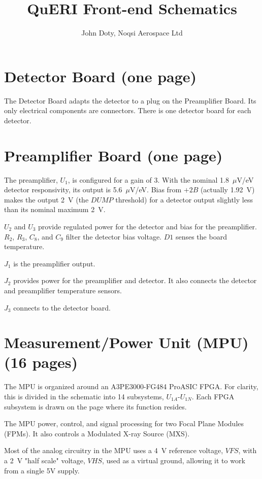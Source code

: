 \documentclass[11pt]{article}
\title{QuERI Front-end Schematics}
\author{John Doty, Noqsi Aerospace Ltd}
\begin{document}
\maketitle

\section{Detector Board (one page)}
The Detector Board adapts the detector to a plug on the Preamplifier Board. Its only electrical components are connectors. There is one detector board for each detector.
\section{Preamplifier Board (one page)}

The preamplifier, $U_1$, is configured for a gain of 3. With the nominal 1.8\ $\mu$V/eV detector responsivity, its output is 5.6\ $\mu$V/eV. Bias from $+2B$ (actually 1.92\ V) makes the output 2\ V (the $DUMP$ threshold) for a detector output slightly less than its nominal maximum 2\ V.

$U_2$ and $U_3$ provide regulated power for the detector and bias for the preamplifier. $R_2$, $R_3$, $C_8$, and $C_9$ filter the detector bias voltage. $D1$ senses the board temperature.

$J_1$ is the preamplifier output.

$J_2$ provides power for the preamplifier and detector. It also connects the detector and preamplifier temperature sensors.

$J_3$ connects to the detector board.

\section{Measurement/Power Unit (MPU) (16 pages)}

The MPU is organized around an A3PE3000-FG484 ProASIC FPGA. For clarity, this is divided in the schematic into 14 subsystems, $U_{1A}$-$U_{1N}$. Each FPGA subsystem is drawn on the page where its function resides.

The MPU power, control, and signal processing for two Focal Plane Modules (FPMs). It also controls a Modulated X-ray Source (MXS).

Most of the analog circuitry in the MPU uses a 4\ V reference voltage, $VFS$, with a 2\ V "half scale" voltage, $VHS$, used as a virtual ground, allowing it to work from a single 5V supply.
\end{document}
